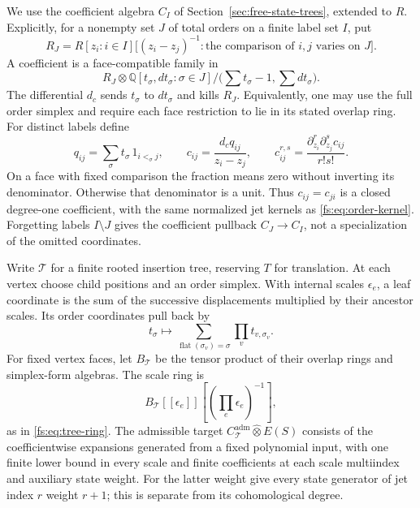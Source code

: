 We use the coefficient algebra \(C_I\) of
Section~\ref{sec:free-state-trees}, extended to \(R\).
Explicitly, for a nonempty set \(J\) of total orders on a finite
label set \(I\), put
\[
 R_J=R[z_i:i\in I]
 \big[(z_i-z_j)^{-1}:
       \text{the comparison of \(i,j\) varies on \(J\)}\big].
\]
A coefficient is a face-compatible family in
\[
 R_J\otimes
 \mathbb Q[t_\sigma,dt_\sigma:\sigma\in J]/
       \bigl(\textstyle\sum t_\sigma-1,\sum dt_\sigma\bigr).
\]
The differential \(d_c\) sends \(t_\sigma\) to \(dt_\sigma\)
and kills \(R_J\).  Equivalently, one may use the full order simplex
and require each face restriction to lie in its stated overlap ring.
For distinct labels define
\begin{equation}\label{cp:eq:kernels}
 q_{ij}=\sum_\sigma t_\sigma\,1_{i<_\sigma j},
 \qquad
 c_{ij}=\frac{d_cq_{ij}}{z_i-z_j},
 \qquad
 c_{ij}^{r,s}=
 \frac{\partial_{z_i}^r\partial_{z_j}^s c_{ij}}{r!s!}.
\end{equation}
On a face with fixed comparison the fraction means zero without
inverting its denominator.  Otherwise that denominator is a unit.
Thus \(c_{ij}=c_{ji}\) is a closed degree-one coefficient, with
the same normalized jet kernels as
\eqref{fs:eq:order-kernel}.  Forgetting labels \(I\setminus J\)
gives the coefficient pullback \(C_J\to C_I\), not a specialization
of the omitted coordinates.

Write \(\mathcal T\) for a finite rooted insertion tree, reserving
\(T\) for translation.  At each vertex choose child positions and
an order simplex.  With internal scales \(\epsilon_e\), a leaf
coordinate is the sum of the successive displacements multiplied
by their ancestor scales.  Its order coordinates pull back by
\begin{equation}\label{cp:eq:flatten}
 t_\sigma\longmapsto
 \sum_{\operatorname{flat}(\sigma_v)=\sigma}
                     \prod_v t_{v,\sigma_v}.
\end{equation}
For fixed vertex faces, let \(B_{\mathcal T}\) be the tensor product
of their overlap rings and simplex-form algebras.  The scale ring is
\[
 B_{\mathcal T}[[\epsilon_e]]
                 [(\textstyle\prod_e\epsilon_e)^{-1}],
\]
as in \eqref{fs:eq:tree-ring}.  The admissible target
\(C_{\mathcal T}^{\mathrm{adm}}\widehat\otimes E(S)\) consists
of the coefficientwise expansions generated from a fixed polynomial
input, with one finite lower bound in every scale and finite
coefficients at each scale multiindex and auxiliary state weight.
For the latter weight give every state generator of jet index \(r\)
weight \(r+1\); this is separate from its cohomological degree.

